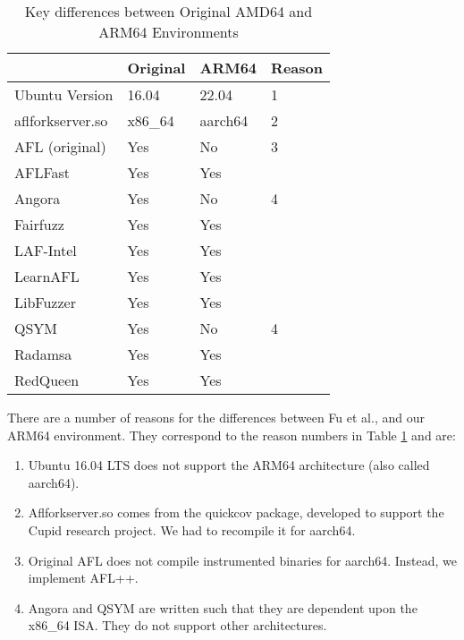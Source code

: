 \begin{table}[ht]
    \begin{tabular}{|l|l|l|l|}
        \hline
                        & Original\cite{Fu} & ARM64 & Reason \\
        \hline
        Ubuntu Version  & 16.04             & 22.04 & 1 \\
        \hline
        aflforkserver.so    & x86\_64           & aarch64 & 2 \\
        \hline
        AFL (original)  & Yes               & No & 3 \\
        \hline
        AFLFast         & Yes               & Yes & \\
        \hline
        Angora          & Yes               & No & 4 \\
        \hline
        Fairfuzz        & Yes               & Yes & \\
        \hline
        LAF-Intel       & Yes               & Yes & \\
        \hline
        LearnAFL        & Yes               & Yes & \\
        \hline
        LibFuzzer       & Yes               & Yes & \\
        \hline
        QSYM            & Yes               & No & 4 \\
        \hline
        Radamsa         & Yes               & Yes & \\
        \hline
        RedQueen        & Yes               & Yes & \\
        \hline
    \end{tabular}
    \caption{Key differences between Original AMD64 and ARM64 Environments}
    \label{arm64-characteristics}
\end{table}

There are a number of reasons for the differences between Fu et al.,
and our ARM64 environment. They correspond to the reason numbers in Table \ref{arm64-characteristics}
and are:
\begin{enumerate}
    \item Ubuntu 16.04 LTS does not support the ARM64 architecture (also called aarch64).
    \item Aflforkserver.so comes from the quickcov package, developed to support the Cupid
    research project\cite{guler2020cupid}. We had to recompile it for aarch64.
    \item Original AFL does not compile instrumented binaries for aarch64. Instead, we
    implement AFL++.
    \item Angora and QSYM are written such that they are dependent upon the x86\_64 ISA.
    They do not support other architectures.
\end{enumerate}

